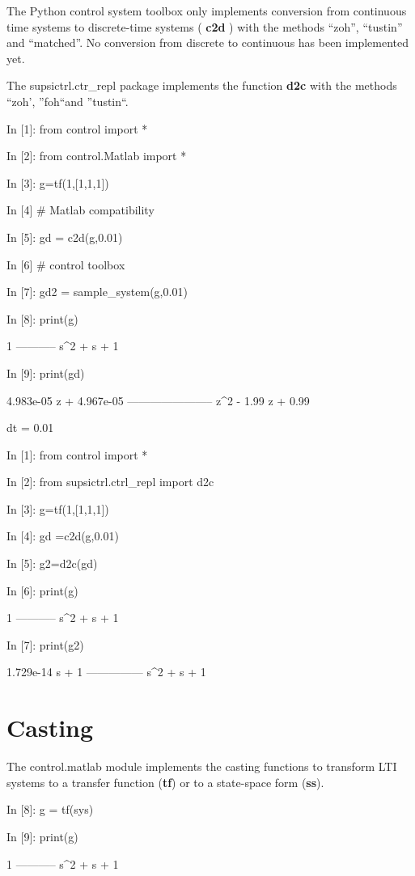 The Python control system toolbox only implements conversion from continuous time systems to discrete-time systems ( \textbf{c2d} ) with the methods 
``zoh'', ``tustin'' and ``matched''. No conversion from discrete to continuous 
has been implemented yet.

The supsictrl.ctr\_repl package implements the function \textbf{d2c} with the methods ``zoh', ''foh``and ''tustin``.

\begin{code}
In [1]: from control import *

In [2]: from control.Matlab import *

In [3]: g=tf(1,[1,1,1])

In [4]  # Matlab compatibility 

In [5]: gd = c2d(g,0.01)             

In [6]  # control toolbox 

In [7]: gd2 = sample_system(g,0.01)  

In [8]: print(g)

     1
-----------
s^2 + s + 1


In [9]: print(gd)

4.983e-05 z + 4.967e-05
-----------------------
  z^2 - 1.99 z + 0.99

dt = 0.01
\end{code}

\begin{code}
In [1]: from control import *

In [2]: from supsictrl.ctrl_repl import d2c

In [3]: g=tf(1,[1,1,1])

In [4]: gd =c2d(g,0.01)

In [5]: g2=d2c(gd)

In [6]: print(g)

     1
-----------
s^2 + s + 1


In [7]: print(g2)

1.729e-14 s + 1
---------------
  s^2 + s + 1
\end{code}

\section{Casting}
The control.matlab module implements the casting functions to transform LTI 
systems to a transfer function (\textbf{tf}) or to a state-space form 
(\textbf{ss}).

\begin{code}
In [8]: g = tf(sys)

In [9]: print(g)

     1
-----------
s^2 + s + 1

\end{code}

